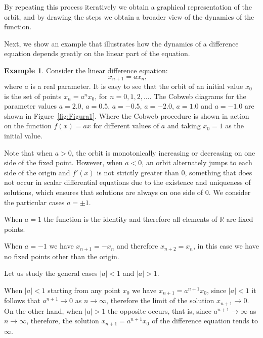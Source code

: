 \documentclass[12pt,a4paper]{report}
\theoremstyle{definition}
\newtheorem{ejemplo}{Example}[section]
\begin{document}
By repeating this process iteratively we obtain a graphical representation of the orbit, and by drawing the steps we obtain a broader view of the dynamics of the function.

Next, we show an example that illustrates how the dynamics of a difference equation depends greatly on the linear part of the equation.

\begin{ejemplo}

Consider the linear difference equation:
\[
x_{n+1} = ax_n, \quad
\]
where \( a \) is a real parameter. It is easy to see that the orbit of an initial value \( x_0 \) is the set of points \( x_n = a^n x_0 \), for \( n = 0, 1, 2, \ldots \). The Cobweb diagrams for the parameter values \( a = 2.0 \), \( a = 0.5 \), \( a = -0.5 \), \( a = -2.0 \), \( a = 1.0 \) and \( a = -1.0 \) are shown in Figure~\ref{fig:Figura1}. Where the Cobweb procedure is shown in action on the function $f(x) = ax$ for different values of $a$ and taking $x_0 = 1$ as the initial value. 

Note that when \( a > 0 \), the orbit is monotonically increasing or decreasing on one side of the fixed point. However, when \( a < 0 \), an orbit alternately jumps to each side of the origin and $f'(x)$ is not strictly greater than $0$, something that does not occur in scalar differential equations due to the existence and uniqueness of solutions, which ensures that solutions are always on one side of $0$. 
We consider the particular cases $a = \pm 1$.

When $a = 1$ the function is the identity and therefore all elements of $\mathbb{R}$ are fixed points.

When $a = -1$ we have $x_{n+1} = - x_{n}$ and therefore $x_{n+2} = x_{n}$, in this case we have no fixed points other than the origin.

Let us study the general cases $|a| < 1$ and $|a| > 1$.

When $|a| < 1$ starting from any point $x_0$ we have $x_{n+1} = a^{n+1}x_0$, since $|a| < 1$ it follows that $a^{n+1} \to 0$ as $n \to \infty$, therefore the limit of the solution $x_{n+1} \to 0$.
On the other hand, when $|a| > 1$ the opposite occurs, that is, since $a^{n+1} \to \infty$ as $n \to \infty$, therefore, the solution $x_{n+1} = a^{n+1}x_0$ of the difference equation tends to $\infty$.
    
\end{ejemplo}
\end{document}
